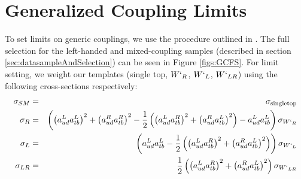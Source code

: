 \section{Generalized Coupling Limits}
\label{sec:GCTheta}
To set limits on generic couplings, we use the procedure outlined in \cite{CMS-PAS-B2G-12-010}.  
The full selection for the left-handed and mixed-coupling samples (described in section \ref{sec:datasampleAndSelection}) can be seen in Figure \ref{figs:GCFS}.
For limit setting, we weight our templates (single top, $W`_R$, $W`_L$, $W`_{LR}$) using the following cross-sections respectively:
\begin{eqnarray}\label{eq:xsec}
{\sigma}_{SM} &=& {\sigma}_{\text{singletop}}\\\nonumber
{\sigma}_{R} &=& \left(\left(a^L_{ud} a^L_{tb}\right)^2 + \left(a^R_{ud} a^R_{tb}\right)^2 - \frac{1}{2}\left(\left(a^L_{ud} a^R_{tb}\right)^2 + \left(a^R_{ud} a^L_{tb}\right)^2\right) - a^L_{ud} a^L_{tb}\right){\sigma}_{W`_R}\\\nonumber
{\sigma}_{L} &=& \left(a^L_{ud} a^L_{tb}-\frac{1}{2}\left(\left(a^L_{ud} a^R_{tb}\right)^2 +\left(a^R_{ud} a^L_{tb}\right)^2\right)\right){\sigma}_{W`_L}\\\nonumber
{\sigma}_{LR} &=& \frac{1}{2}\left(\left(a^L_{ud} a^R_{tb}\right)^2 +\left(a^R_{ud} a^L_{tb}\right)^2\right){\sigma}_{W`_{LR}}\\\nonumber
\end{eqnarray}



